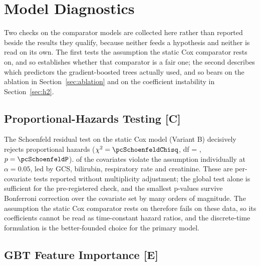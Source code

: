 

\section{Model Diagnostics}
\label{sec:model_diagnostics}

Two checks on the comparator models are collected here rather than reported
beside the results they qualify, because neither feeds a hypothesis and neither
is read on its own. The first tests the assumption the static Cox comparator
rests on, and so establishes whether that comparator is a fair one; the second
describes which predictors the gradient-boosted trees actually used, and so
bears on the ablation in Section~\ref{sec:ablation} and on the coefficient
instability in Section~\ref{sec:h2}.

\subsection{Proportional-Hazards Testing \texorpdfstring{[C]}{[C]}}
\label{sec:schoenfeld}

The Schoenfeld residual test on the static Cox model (Variant B) decisively
rejects proportional hazards ($\chi^2 = \pcSchoenfeldChisq$,
df = \pcSchoenfeldDf, $p = \pcSchoenfeldP$).
\pcSchoenfeldNViolate{} of the \pcSchoenfeldNCovariates{} covariates violate
the assumption individually at $\alpha = 0.05$, led by GCS, bilirubin,
respiratory rate and creatinine. These are per-covariate tests reported without
multiplicity adjustment; the global test alone is sufficient for the
pre-registered check, and the smallest p-values survive Bonferroni correction
over the covariate set by many orders of magnitude. The assumption the static
Cox comparator rests on therefore fails on these data, so its coefficients
cannot be read as time-constant hazard ratios, and the discrete-time
formulation is the better-founded choice for the primary model.

\subsection{GBT Feature Importance \texorpdfstring{[E]}{[E]}}
\label{sec:feature_importance}

